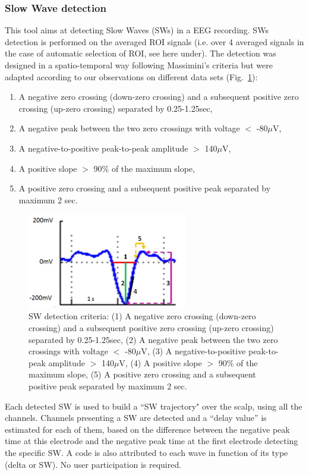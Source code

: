 \documentclass[a4paper,titlepage]{article}
\begin{document}
\subsubsection{Slow Wave detection}
\label{sec:SWdetection}

This tool aims at detecting Slow Waves (SWs) in a EEG recording. 
SWs detection is performed on the averaged ROI signals (i.e. over 4 averaged signals in the case of automatic selection of ROI, see here under). The detection was designed in a spatio-temporal way following Massimini's criteria \cite{Massimini2004} but were adapted according to our observations on different data sets (Fig.~\ref{fig:SWS_crit}):
\begin{enumerate}
\item A negative zero crossing (down-zero crossing) and a subsequent positive zero crossing (up-zero crossing) separated by 0.25-1.25sec,
\item A negative peak between the two zero crossings with voltage $<$ -80$\mu$V,
\item A negative-to-positive peak-to-peak amplitude $>$ 140$\mu$V,
\item A positive slope $>$ 90\% of the maximum slope, 
\item A positive zero crossing and a subsequent positive peak separated by maximum 2 sec.
\end{enumerate}
\begin{figure}[ht]
	\centering
		\includegraphics[width=7cm]{images/FIG16_SWS_criteria.jpg}
	\caption{SW detection criteria: (1)	A negative zero crossing (down-zero crossing) and a subsequent positive zero crossing (up-zero crossing) separated by 0.25-1.25sec, (2) A negative peak between the two zero crossings with voltage $<$ -80$\mu$V, (3)	A negative-to-positive peak-to-peak amplitude $>$ 140$\mu$V, (4)	A positive slope $>$ 90\% of the maximum slope, (5)	A positive zero crossing and a subsequent positive peak separated by maximum 2 sec.
	\label{fig:SWS_crit}}
\end{figure}

Each detected SW is used to build a ``SW trajectory" over the scalp, using all the channels. Channels presenting a SW are detected and a ``delay value'' is estimated for each of them, based on the difference between the negative peak time at this electrode and the negative peak time at the first electrode detecting the specific SW. A code is also attributed to each wave in function of its type (delta or SW). No user participation is required.
\end{document}
